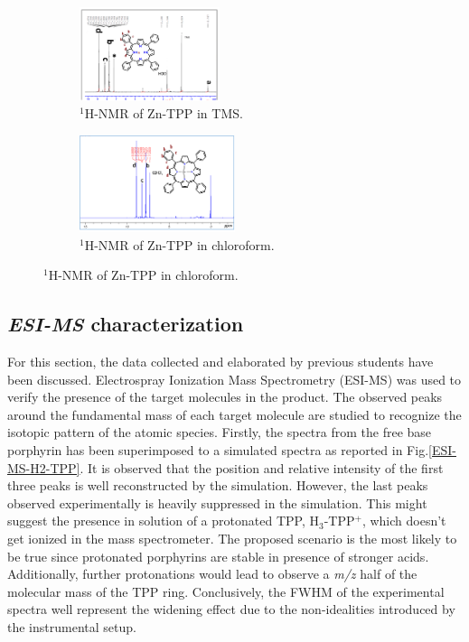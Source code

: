 \documentclass[num-refs]{wiley-article}
\begin{document}
\begin{figure}
    \centering
    \begin{subfigure}
        \centering
        \includegraphics[width=0.45\textwidth]{1H-NMR-H2-TPP}
        \caption{$^{1}$H-NMR of Zn-TPP in TMS.}
        \label{NMR-H2-TPP}
    \end{subfigure}
    \begin{subfigure}
        \centering
        \includegraphics[width=0.5\textwidth]{1H-NMR-Zn-TPP}
        \caption{$^{1}$H-NMR of Zn-TPP in chloroform.}
        \label{NMR-Zn-TPP}
    \end{subfigure}
\end{figure}
\subsection{\textit{ESI-MS} characterization}
For this section, the data collected and elaborated by previous students have been discussed.
Electrospray Ionization Mass Spectrometry (ESI-MS) was used to verify the presence of the target molecules in the product.
The observed peaks around the fundamental mass of each target molecule are studied to recognize the isotopic pattern of the atomic species.
Firstly, the spectra from the free base porphyrin has been superimposed to a simulated spectra as reported in Fig.\ref{ESI-MS-H2-TPP}.
It is observed that the position and relative intensity of the first three peaks is well reconstructed by the simulation.
However, the last peaks observed experimentally is heavily suppressed in the simulation.
This might suggest the presence in solution of a protonated TPP, H$_{3}$-TPP$^{+}$, which doesn't get ionized in the mass spectrometer.
The proposed scenario is the most likely to be true since protonated porphyrins are stable in presence of stronger acids.
Additionally, further protonations would lead to observe a \textit{m/z} half of the molecular mass of the TPP ring.
Conclusively, the FWHM of the experimental spectra well represent the widening effect due to the non-idealities introduced by the instrumental setup.\\
\end{document}

